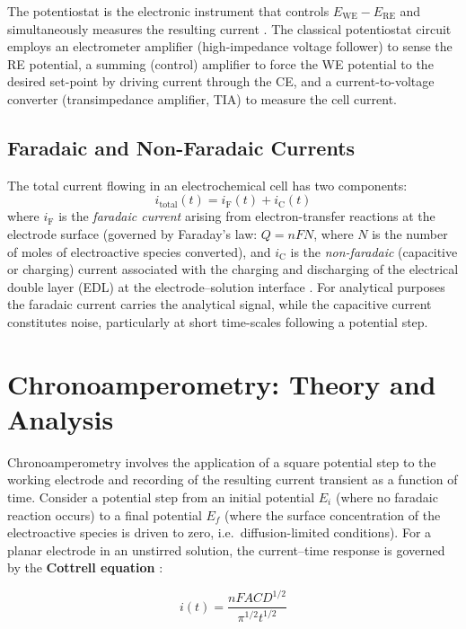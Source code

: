 The potentiostat is the electronic instrument that controls $E_\mathrm{WE} - E_\mathrm{RE}$ and simultaneously measures the resulting current \cite{Kissinger1996}. The classical potentiostat circuit employs an electrometer amplifier (high-impedance voltage follower) to sense the RE potential, a summing (control) amplifier to force the WE potential to the desired set-point by driving current through the CE, and a current-to-voltage converter (transimpedance amplifier, TIA) to measure the cell current.

\subsection{Faradaic and Non-Faradaic Currents}
\label{subsec:faradaic}

The total current flowing in an electrochemical cell has two components:
\begin{equation}
    i_\mathrm{total}(t) = i_\mathrm{F}(t) + i_\mathrm{C}(t)
\end{equation}
where $i_\mathrm{F}$ is the \textit{faradaic current} arising from electron-transfer reactions at the electrode surface (governed by Faraday's law: $Q = nFN$, where $N$ is the number of moles of electroactive species converted), and $i_\mathrm{C}$ is the \textit{non-faradaic} (capacitive or charging) current associated with the charging and discharging of the electrical double layer (EDL) at the electrode–solution interface \cite{Bard2001}. For analytical purposes the faradaic current carries the analytical signal, while the capacitive current constitutes noise, particularly at short time-scales following a potential step.

\section{Chronoamperometry: Theory and Analysis}
\label{sec:ca_theory}

Chronoamperometry involves the application of a square potential step to the working electrode and recording of the resulting current transient as a function of time. Consider a potential step from an initial potential $E_i$ (where no faradaic reaction occurs) to a final potential $E_f$ (where the surface concentration of the electroactive species is driven to zero, i.e.\ diffusion-limited conditions). For a planar electrode in an unstirred solution, the current–time response is governed by the \textbf{Cottrell equation} \cite{Cottrell1902}:

\begin{equation}
    i(t) = \frac{nFACD^{1/2}}{\pi^{1/2} t^{1/2}}
    \label{eq:cottrell}
\end{equation}

